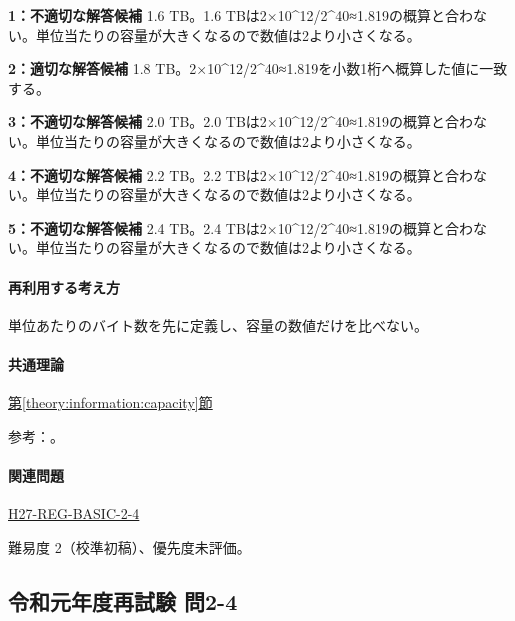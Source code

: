 \noindent\textbf{1：不適切な解答候補} 1.6 TB。1.6 TBは2×10\textasciicircum{}12/2\textasciicircum{}40≈1.819の概算と合わない。単位当たりの容量が大きくなるので数値は2より小さくなる。\par

\noindent\textbf{2：適切な解答候補} 1.8 TB。2×10\textasciicircum{}12/2\textasciicircum{}40≈1.819を小数1桁へ概算した値に一致する。\par

\noindent\textbf{3：不適切な解答候補} 2.0 TB。2.0 TBは2×10\textasciicircum{}12/2\textasciicircum{}40≈1.819の概算と合わない。単位当たりの容量が大きくなるので数値は2より小さくなる。\par

\noindent\textbf{4：不適切な解答候補} 2.2 TB。2.2 TBは2×10\textasciicircum{}12/2\textasciicircum{}40≈1.819の概算と合わない。単位当たりの容量が大きくなるので数値は2より小さくなる。\par

\noindent\textbf{5：不適切な解答候補} 2.4 TB。2.4 TBは2×10\textasciicircum{}12/2\textasciicircum{}40≈1.819の概算と合わない。単位当たりの容量が大きくなるので数値は2より小さくなる。\par

\paragraph{再利用する考え方} 単位あたりのバイト数を先に定義し、容量の数値だけを比べない。

\paragraph{共通理論} \hyperref[theory:information:capacity]{第\ref*{theory:information:capacity}節}

\par 参考：\cite{nist_binary_prefix}。

\paragraph{関連問題} \hyperref[q:h27-reg-basic-2-4]{H27-REG-BASIC-2-4}

\par 難易度 2（校準初稿）、優先度未評価。

\subsection{令和元年度再試験 問2-4}
\label{q:r01-ret-basic-2-4}

